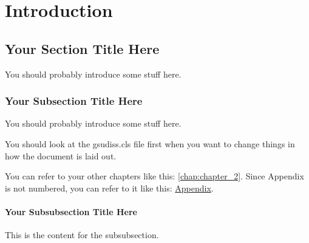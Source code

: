 \chapter{Introduction}
\label{chap:introduction}

\section{Your Section Title Here}
	You should probably introduce some stuff here.

\subsection{Your Subsection Title Here}
You should probably introduce some stuff here.

You should look at the gsudiss.cls file first when you want to change things in how the document is laid out. 

You can refer to your other chapters like this: \chap\ref{chap:chapter_2}. Since Appendix is not numbered, you can refer to it like this: \hyperref[chap:appendix]{Appendix}.

\subsubsection{Your Subsubsection Title Here}
This is the content for the subsubsection.
